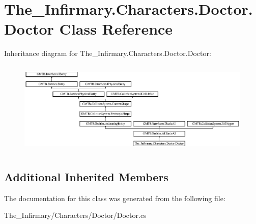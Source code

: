 \hypertarget{class_the___infirmary_1_1_characters_1_1_doctor_1_1_doctor}{}\section{The\+\_\+\+Infirmary.\+Characters.\+Doctor.\+Doctor Class Reference}
\label{class_the___infirmary_1_1_characters_1_1_doctor_1_1_doctor}
Inheritance diagram for The\+\_\+\+Infirmary.\+Characters.\+Doctor.\+Doctor\+:\begin{figure}[H]
\begin{center}
\leavevmode
\includegraphics[height=4.497992cm]{class_the___infirmary_1_1_characters_1_1_doctor_1_1_doctor}
\end{center}
\end{figure}
\subsection*{Additional Inherited Members}


The documentation for this class was generated from the following file\+:\begin{DoxyCompactItemize}
\item 
The\+\_\+\+Infirmary/\+Characters/\+Doctor/Doctor.\+cs\end{DoxyCompactItemize}
